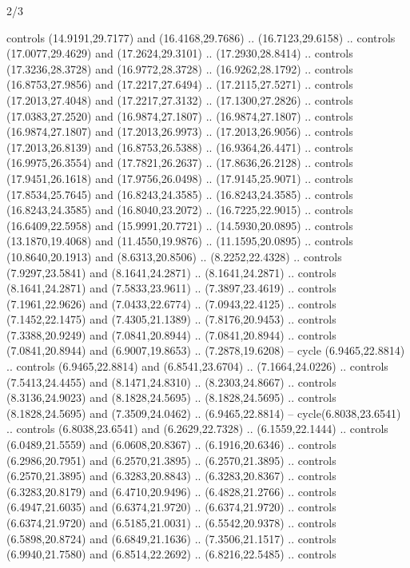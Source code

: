 \begin{flagdescription}{2/3}
{\begin{scope}[xshift=0.5\flaglength,yshift=0.5\flagwidth,scale=\flagwidth/33.602]
\begin{scope}[y=0.8pt, x=0.8pt, yscale=-1,shift={(-12,-26)}]
    controls (14.9191,29.7177) and (16.4168,29.7686) .. (16.7123,29.6158) ..
    controls (17.0077,29.4629) and (17.2624,29.3101) .. (17.2930,28.8414) ..
    controls (17.3236,28.3728) and (16.9772,28.3728) .. (16.9262,28.1792) ..
    controls (16.8753,27.9856) and (17.2217,27.6494) .. (17.2115,27.5271) ..
    controls (17.2013,27.4048) and (17.2217,27.3132) .. (17.1300,27.2826) ..
    controls (17.0383,27.2520) and (16.9874,27.1807) .. (16.9874,27.1807) ..
    controls (16.9874,27.1807) and (17.2013,26.9973) .. (17.2013,26.9056) ..
    controls (17.2013,26.8139) and (16.8753,26.5388) .. (16.9364,26.4471) ..
    controls (16.9975,26.3554) and (17.7821,26.2637) .. (17.8636,26.2128) ..
    controls (17.9451,26.1618) and (17.9756,26.0498) .. (17.9145,25.9071) ..
    controls (17.8534,25.7645) and (16.8243,24.3585) .. (16.8243,24.3585) ..
    controls (16.8243,24.3585) and (16.8040,23.2072) .. (16.7225,22.9015) ..
    controls (16.6409,22.5958) and (15.9991,20.7721) .. (14.5930,20.0895) ..
    controls (13.1870,19.4068) and (11.4550,19.9876) .. (11.1595,20.0895) ..
    controls (10.8640,20.1913) and (8.6313,20.8506) .. (8.2252,22.4328) ..
    controls (7.9297,23.5841) and (8.1641,24.2871) .. (8.1641,24.2871) .. controls
    (8.1641,24.2871) and (7.5833,23.9611) .. (7.3897,23.4619) .. controls
    (7.1961,22.9626) and (7.0433,22.6774) .. (7.0943,22.4125) .. controls
    (7.1452,22.1475) and (7.4305,21.1389) .. (7.8176,20.9453) .. controls
    (7.3388,20.9249) and (7.0841,20.8944) .. (7.0841,20.8944) .. controls
    (7.0841,20.8944) and (6.9007,19.8653) .. (7.2878,19.6208) -- cycle (6.9465,22.8814) ..
    controls (6.9465,22.8814) and (6.8541,23.6704) .. (7.1664,24.0226) .. controls
    (7.5413,24.4455) and (8.1471,24.8310) .. (8.2303,24.8667) .. controls
    (8.3136,24.9023) and (8.1828,24.5695) .. (8.1828,24.5695) .. controls
    (8.1828,24.5695) and (7.3509,24.0462) .. (6.9465,22.8814) -- cycle(6.8038,23.6541) ..
    controls (6.8038,23.6541) and (6.2629,22.7328) .. (6.1559,22.1444) .. controls
    (6.0489,21.5559) and (6.0608,20.8367) .. (6.1916,20.6346) .. controls
    (6.2986,20.7951) and (6.2570,21.3895) .. (6.2570,21.3895) .. controls
    (6.2570,21.3895) and (6.3283,20.8843) .. (6.3283,20.8367) .. controls
    (6.3283,20.8179) and (6.4710,20.9496) .. (6.4828,21.2766) .. controls
    (6.4947,21.6035) and (6.6374,21.9720) .. (6.6374,21.9720) .. controls
    (6.6374,21.9720) and (6.5185,21.0031) .. (6.5542,20.9378) .. controls
    (6.5898,20.8724) and (6.6849,21.1636) .. (7.3506,21.1517) .. controls
    (6.9940,21.7580) and (6.8514,22.2692) .. (6.8216,22.5485) .. controls

\end{scope}
\end{scope}}
\end{flagdescription}
